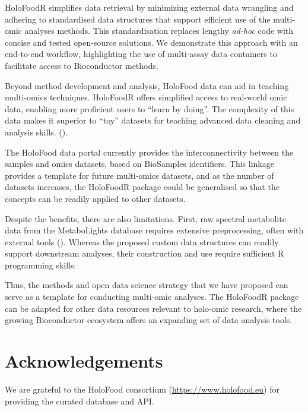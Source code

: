 \documentclass[unnumsec,webpdf,namedate,modern,large]{oup-authoring-template}%
\begin{document}
HoloFoodR simplifies data retrieval by minimizing external data wrangling and adhering to standardised data structures that support efficient use of the multi-omic analyses methods. This standardisation replaces lengthy \textit{ad-hoc} code with concise and tested open-source solutions. We demonstrate this approach with an end-to-end workflow, highlighting the use of multi-assay data containers to facilitate access to Bioconductor methods.

Beyond method development and analysis, HoloFood data can aid in teaching multi-omics techniques. HoloFoodR offers simplified access to real-world omic data, enabling more proficient users to “learn by doing”. The complexity of this data makes it superior to “toy” datasets for teaching advanced data cleaning and analysis skills. (\cite{drnevich_2025}).

The HoloFood data portal currently provides the interconnectivity between the samples and omics datasets, based on BioSamples identifiers. This linkage provides a template for future multi-omics datasets, and as the number of datasets increases, the HoloFoodR package could be generalised so that the concepts can be readily applied to other datasets.

Despite the benefits, there are also limitations. First, raw spectral metabolite data from the MetaboLights database requires extensive preprocessing, often with external tools (\cite{klavus_2020}). Whereas the proposed custom data structures can readily support downstream analyses, their construction and use require sufficient R programming skills.

Thus, the methods and open data science strategy that we have proposed can serve as a template for conducting multi-omic analyses. The HoloFoodR package can be adapted for other data resources relevant to holo-omic research, where the growing Bioconductor ecosystem offers an expanding set of data analysis tools. 

\section{Acknowledgements}

We are grateful to the HoloFood consortium (\url{https://www.holofood.eu}) for providing the curated database and API.

\end{document}
